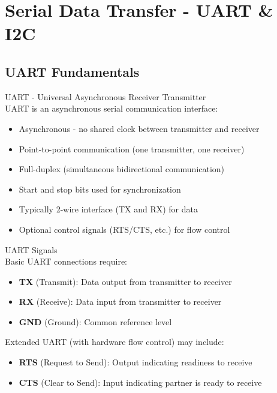 \section{Serial Data Transfer - UART \& I2C}

\subsection{UART Fundamentals}


\begin{concept}{UART - Universal Asynchronous Receiver Transmitter}\\
UART is an asynchronous serial communication interface:
\begin{itemize}
    \item Asynchronous - no shared clock between transmitter and receiver
    \item Point-to-point communication (one transmitter, one receiver)
    \item Full-duplex (simultaneous bidirectional communication)
    \item Start and stop bits used for synchronization
    \item Typically 2-wire interface (TX and RX) for data
    \item Optional control signals (RTS/CTS, etc.) for flow control
\end{itemize}
\end{concept}

\begin{definition}{UART Signals}\\
Basic UART connections require:
\begin{itemize}
    \item \textbf{TX} (Transmit): Data output from transmitter to receiver
    \item \textbf{RX} (Receive): Data input from transmitter to receiver
    \item \textbf{GND} (Ground): Common reference level
\end{itemize}
Extended UART (with hardware flow control) may include:
\begin{itemize}
    \item \textbf{RTS} (Request to Send): Output indicating readiness to receive
    \item \textbf{CTS} (Clear to Send): Input indicating partner is ready to receive
\end{itemize}
\end{definition}

